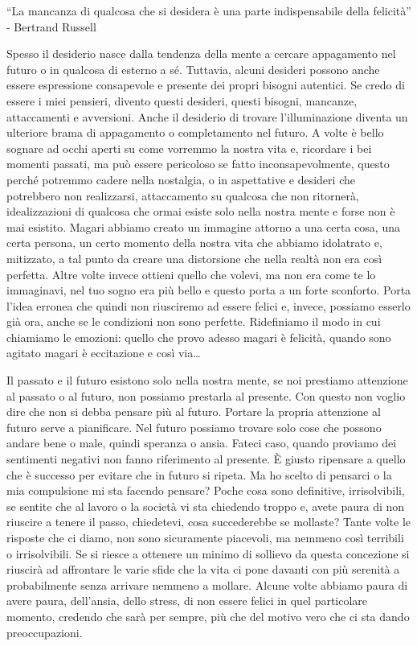 \documentclass[12pt]{book} %
\begin{document}
“La mancanza di qualcosa che si desidera è una parte indispensabile della felicità” - Bertrand Russell

Spesso il desiderio nasce dalla tendenza della mente a cercare appagamento nel futuro o in qualcosa di esterno a sé. Tuttavia, alcuni desideri possono anche essere espressione consapevole e presente dei propri bisogni autentici. Se
credo di essere i miei pensieri, divento questi desideri, questi bisogni, mancanze, attaccamenti e avversioni. Anche il
desiderio di trovare l'illuminazione diventa un ulteriore brama di appagamento o completamento nel
futuro. A volte è bello sognare ad occhi aperti su come vorremmo la nostra vita e, ricordare i bei momenti passati, ma può essere
pericoloso se fatto inconsapevolmente, questo perché potremmo cadere nella nostalgia, o in aspettative e desideri che potrebbero non realizzarsi, attaccamento su qualcosa che non ritornerà, idealizzazioni di qualcosa che ormai esiste solo nella nostra mente e forse non è mai esistito. Magari abbiamo creato un immagine attorno a una certa cosa, una certa persona, un certo momento della nostra
vita che abbiamo idolatrato e, mitizzato, a tal punto da creare una distorsione che nella realtà non era così perfetta.
Altre volte invece ottieni quello che volevi, ma non era come te lo immaginavi, nel tuo sogno era più bello e questo
porta a un forte sconforto. Porta l'idea erronea che quindi non riusciremo ad essere felici e, invece, possiamo esserlo già ora, anche se le condizioni non sono perfette. Ridefiniamo il modo in cui chiamiamo le emozioni:
quello che provo adesso magari è felicità, quando sono agitato magari è eccitazione e così via…

Il passato e il futuro
esistono solo nella nostra mente, se noi prestiamo attenzione al passato o al futuro, non possiamo prestarla al
presente. Con questo non voglio dire che non
si debba pensare più al futuro. Portare la propria attenzione al futuro serve a pianificare. Nel futuro possiamo trovare solo cose che possono
andare bene o male, quindi speranza o ansia. Fateci caso, quando proviamo dei sentimenti negativi non fanno riferimento
al presente. È giusto ripensare a quello che è successo per evitare che in futuro si ripeta. Ma ho scelto di pensarci o la mia compulsione mi sta facendo pensare?
Poche cosa sono definitive, irrisolvibili, se sentite che al lavoro o la società
vi sta chiedendo troppo e, avete paura di non riuscire a tenere il passo, chiedetevi, cosa succederebbe se mollaste?
Tante volte le risposte che ci diamo, non sono sicuramente piacevoli, ma nemmeno così terribili o irrisolvibili. Se si riesce a ottenere un minimo di sollievo da questa concezione si
riuscirà ad affrontare le varie sfide che la vita ci pone davanti con più serenità a probabilmente senza arrivare
nemmeno a mollare. Alcune volte abbiamo paura di avere paura, dell'ansia, dello stress, di non
essere felici in quel particolare momento, credendo che sarà per sempre, più che del motivo vero che ci sta dando
preoccupazioni.
\end{document}
